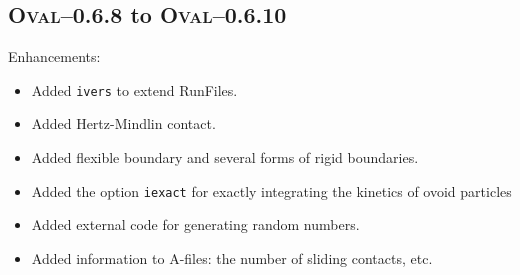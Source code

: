 \documentclass[letterpaper,11pt]{article}
\newcommand{\Oval}{\textsc{Oval}}
\newcommand{\RunFile}{\textsf{RunFile}}
\begin{document}
\subsection{\Oval--0.6.8 to \Oval--0.6.10}\label{sec:oval068_to_oval0610}
Enhancements:
\begin{itemize}
\item
Added \texttt{ivers} to extend {\RunFile}s.
\item
Added Hertz-Mindlin contact.
\item
Added flexible boundary and several forms of rigid boundaries.
\item
Added the option \texttt{iexact} for exactly integrating the kinetics
of ovoid particles
\item
Added external code for generating random numbers.
\item
Added information to A-files: the number of sliding contacts, etc.
\end{itemize}
%
%
%

%
%
\end{document}
